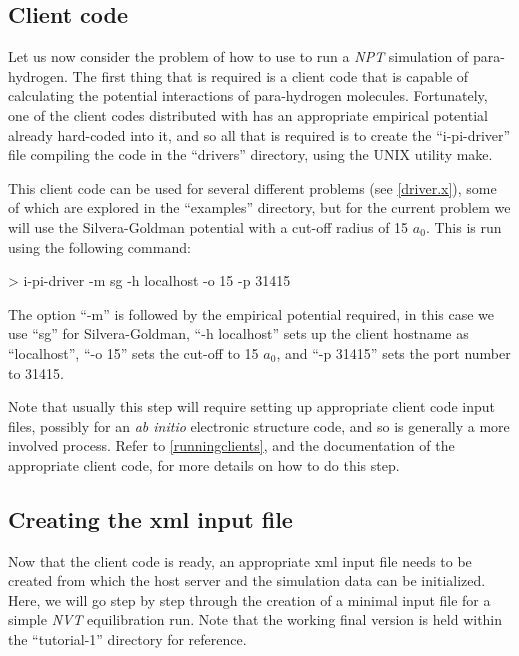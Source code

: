 \documentclass[11pt,english,fleqn]{report}
\newenvironment{code}{%
\footnotesize 
\verbatim
}{
\endverbatim
\normalsize
}
\begin{document}
\label{part1}

\subsection{Client code}

Let us now consider the problem of how to use \ipi to run a \emph{NPT}
simulation of para-hydrogen. The first thing that is required is a
client code that is capable of calculating the potential interactions
of para-hydrogen molecules. Fortunately, one of the client codes distributed
with \ipi has an appropriate empirical potential already hard-coded
into it, and
so all that is required is to create the {}``i-pi-driver'' file
compiling the code in
the {}``drivers'' directory, using the UNIX utility make.

This client code can be used for several different problems
(see \ref{driver.x}), some of which
are explored in the {}``examples'' directory, but for the current problem
we will use the Silvera-Goldman potential with a cut-off radius
of 15 \(a_0\). This is run using the following command:

\begin{code}
> i-pi-driver -m sg -h localhost -o 15 -p 31415
\end{code}

The option {}``-m'' is followed by the empirical potential required,
in this case we use {}``sg'' for Silvera-Goldman, 
{}``-h localhost'' sets up the client hostname
as {}``localhost'', {}``-o 15'' sets the cut-off to 15 \(a_0\), 
and {}``-p 31415'' sets the port number to 31415. 

Note that usually this step will require setting up appropriate
client code input files, possibly for an \emph{ab initio} electronic
structure code, and so is generally a more involved process. Refer
to \ref{runningclients}, and the documentation of the appropriate
client code, for more details on how to do this step.


\subsection{Creating the xml input file}

Now that the client code is ready, an appropriate xml input file needs
to be created from which the host server and the simulation data can
be initialized. Here, we will go step by step through the creation
of a minimal input file for a simple \emph{NVT} equilibration run. Note that
the working final version is held within the {}``tutorial-1'' directory
for reference.
\end{document}
